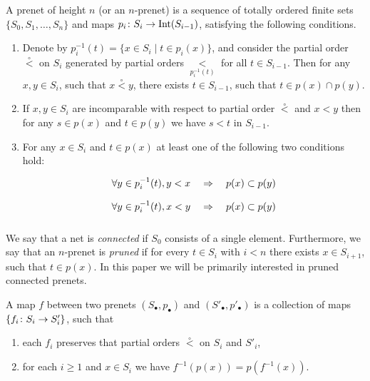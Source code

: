 \documentclass[letterpaper,12pt,leqno]{article}
\numberwithin{equation}{theorem}
\def\Int{\mathrm{Int}}
\def\lesub{\mathop{<}\limits}
\def\pless{\lesub^\circ}
\begin{document}
\begin{definition}
A prenet of height $n$ (or an $n$-prenet) is a sequence of totally ordered finite sets $\{S_0, S_1, \ldots, S_n\}$ and maps $p_i \from S_i \to \Int(S_{i-1})$,
satisfying the following conditions.
\begin{enumerate}[label=\alph*)]
\item Denote by $p_i^{-1}(t) = \{x \in S_i \mid t \in p_i(x)\}$, and consider the partial order $\pless$ on $S_i$ generated by partial orders
$\lesub_{p_i^{-1}(t)}$ for all $t \in S_{i-1}$. Then for any $x, y \in S_i$, such that $x \pless y$, there exists $t \in S_{i-1}$, such that $t \in p(x) \cap p(y)$.

\item If $x, y \in S_i$ are incomparable with respect to partial order $\pless$ and $x < y$ then for any $s \in p(x)$ and $t \in p(y)$ we have $s < t$ in $S_{i-1}$.

\item For any $x \in S_i$ and $t \in p(x)$ at least one of the following two conditions hold:
$$
\begin{tikzcd}[row sep=tiny]
\forall y \in p_i^{-1}(t), y < x \quad\Rightarrow\quad p(x) \subset p(y)\\
\forall y \in p_i^{-1}(t), x < y \quad\Rightarrow\quad p(x) \subset p(y)\\
\end{tikzcd}
$$
\end{enumerate}
\end{definition}

We say that a net is {\em connected} if $S_0$ consists of a single element. Furthermore, we say that an $n$-prenet is {\em pruned} if for every $t \in S_i$ with $i < n$
there exists $x \in S_{i+1}$, such that $t \in p(x)$. In this paper we will be primarily interested in pruned connected prenets.

\begin{definition}
A map $f$ between two prenets $(S_\bullet, p_\bullet)$ and $(S'_\bullet, p'_\bullet)$ is a collection of maps $\{f_i\colon S_i \to S'_i\}$, such that
\begin{enumerate}[label=\alph*)]
\item each $f_i$ preserves that partial orders $\pless$ on $S_i$ and $S'_i$,
\item for each $i \ge 1$ and $x \in S_i$ we have $f^{-1}(p(x)) = p(f^{-1}(x))$.
\end{enumerate}
\end{definition}
\end{document}
